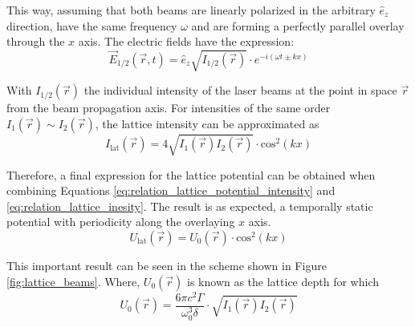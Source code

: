 This way, assuming that both beams are linearly polarized in the arbitrary $\hat{e}_z$ direction, have the same frequency $\omega$ and are forming a perfectly parallel overlay through the $x$ axis. The electric fields have the expression:
\begin{equation}\label{eq:relation_electric_fields}
	\vec{E}_{1/2}(\vec{r}, t) = \hat{e}_z \sqrt{I_{1/2}(\vec{r})}\cdot e^{-i(\omega t \pm kx)}
\end{equation}

With $I_{1/2}(\vec{r})$ the individual intensity of the laser beams at the point in space $\vec{r}$ from the beam propagation axis. For intensities of the same order $I_{1}(\vec{r}) \sim I_{2}(\vec{r})$, the lattice intensity can be approximated as
\begin{equation}\label{eq:relation_lattice_inesity}
	I_{\text{lat}}(\vec{r}) = 4\sqrt{I_{1}(\vec{r})I_{2}(\vec{r})} \cdot \text{cos}^2(kx)
\end{equation}

Therefore, a final expression for the lattice potential can be obtained when combining Equations \eqref{eq:relation_lattice_potential_intensity} and \eqref{eq:relation_lattice_inesity}. The result is as expected, a temporally static potential with periodicity along the overlaying $x$ axis.
\begin{equation}\label{eq:relation_lattice_potential}
	U_{\text{lat}}(\vec{r}) = U_{0}(\vec{r}) \cdot \text{cos}^2(kx)
\end{equation} 

This important result can be seen in the scheme shown in Figure \ref{fig:lattice_beams}. Where, $U_{0}(\vec{r})$ is known as the lattice depth for which
\begin{equation}\label{eq:relation_lattice_potential_depth}
	U_{0}(\vec{r}) = \frac{6\pi c^2 \Gamma}{\omega_0^3 \delta} \cdot \sqrt{I_{1}(\vec{r})I_{2}(\vec{r})}
\end{equation} 

